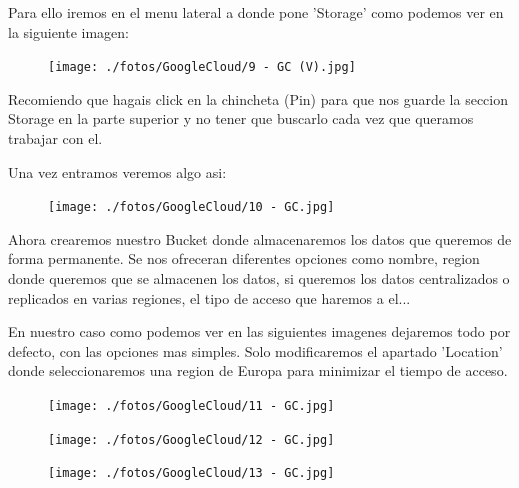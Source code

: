 \documentclass[a4paper,10pt]{article}
\begin{document}
Para ello iremos en el menu lateral a donde pone 'Storage' como podemos ver en la siguiente imagen:

\begin{figure}[H]
\begin{center}
\texttt{[image: ./fotos/GoogleCloud/9 - GC (V).jpg]}
\end{center}
\end{figure}

Recomiendo que hagais click en la chincheta (Pin) para que nos guarde la seccion Storage en la parte superior y no tener que buscarlo cada vez que queramos trabajar con el.

Una vez entramos veremos algo asi:

\begin{figure}[H]
\begin{center}
\texttt{[image: ./fotos/GoogleCloud/10 - GC.jpg]}
\end{center}
\end{figure}

Ahora crearemos nuestro Bucket donde almacenaremos los datos que queremos de forma permanente. Se nos ofreceran diferentes opciones como nombre, region donde queremos que se almacenen los datos, si queremos los datos centralizados o replicados en varias regiones, el tipo de acceso que haremos a el... 

En nuestro caso como podemos ver en las siguientes imagenes dejaremos todo por defecto, con las opciones mas simples. Solo modificaremos el apartado 'Location' donde seleccionaremos una region de Europa para minimizar el tiempo de acceso.

\begin{figure}[H]
\begin{center}
\texttt{[image: ./fotos/GoogleCloud/11 - GC.jpg]}
\end{center}
\end{figure}

\begin{figure}[H]
\begin{center}
\texttt{[image: ./fotos/GoogleCloud/12 - GC.jpg]}
\end{center}
\end{figure}

\begin{figure}[H]
\begin{center}
\texttt{[image: ./fotos/GoogleCloud/13 - GC.jpg]}
\end{center}
\end{figure}
\end{document}
